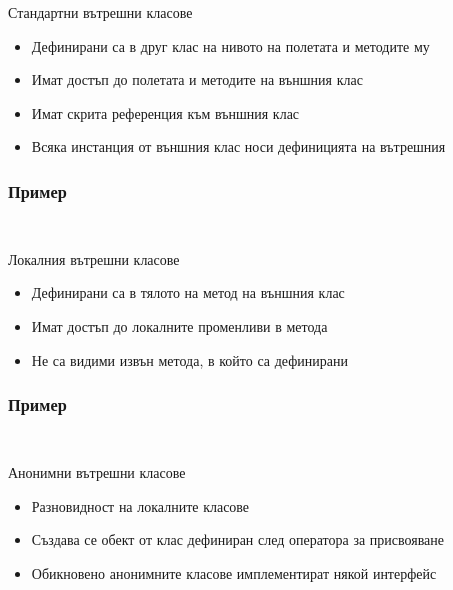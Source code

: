 \documentclass{beamer}
\begin{document}
\begin{frame}{Стандартни вътрешни класове}
  \transdissolve
  \begin{itemize}
  \item Дефинирани са в друг клас на нивото на полетата и методите му
  \item Имат достъп до полетата и методите на външния клас
  \item Имат скрита референция към външния клас
  \item Всяка инстанция от външния клас носи дефиницията на вътрешния
  \end{itemize}
\end{frame}

\begin{frame}[fragile]
  \frametitle{Пример}
  \transdissolve
\begin{lstlisting}
  
\end{lstlisting}
\end{frame}

\begin{frame}{Локалния вътрешни класове}
  \transdissolve
  \begin{itemize}
  \item Дефинирани са в тялото на метод на външния клас
  \item Имат достъп до локалните променливи в метода
  \item Не са видими извън метода, в който са дефинирани
  \end{itemize}
\end{frame}

\begin{frame}[fragile]
  \frametitle{Пример}
  \transdissolve
\begin{lstlisting}
  
\end{lstlisting}
\end{frame}

\begin{frame}{Анонимни вътрешни класове}
  \transdissolve
  \begin{itemize}
  \item Разновидност на локалните класове
  \item Създава се обект от клас дефиниран след оператора за
    присвояване
  \item Обикновено анонимните класове имплементират някой интерфейс
  \end{itemize}
\end{frame}
\end{document}
